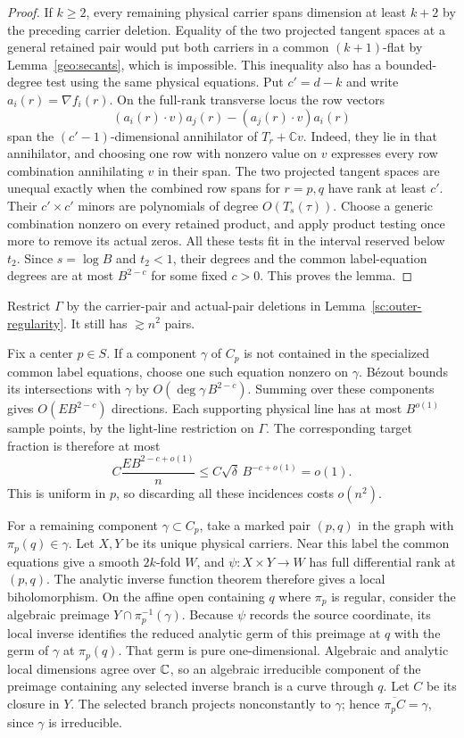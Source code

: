 \begin{proof}
If $k\ge2$, every remaining physical carrier spans dimension at least
$k+2$ by the preceding carrier deletion.  Equality of the two projected tangent
spaces at a general retained pair would put both carriers in a common
$(k+1)$-flat by Lemma~\ref{geo:secants}, which is impossible.  This
inequality also has a bounded-degree test using the same physical
equations.  Put $c'=d-k$ and write $a_i(r)=\nabla f_i(r)$.  On the
full-rank transverse locus the row vectors
\[
 (a_i(r)\mathbin{\cdot}v)a_j(r)
 -(a_j(r)\mathbin{\cdot}v)a_i(r)
\]
span the $(c'-1)$-dimensional annihilator of $T_r+\mathbb Cv$.
Indeed, they lie in that annihilator, and choosing one row with nonzero
value on $v$ expresses every row combination annihilating $v$ in their
span.  The two projected tangent spaces are unequal exactly when the
combined row spans for $r=p,q$ have rank at least $c'$.  Their
$c'\times c'$ minors are polynomials of degree $O(T_s(\tau))$.  Choose a generic
combination nonzero on every retained product, and apply product testing
once more to remove its actual zeros.  All these tests fit in
the interval reserved below $t_2$.  Since $s=\log B$ and $t_2<1$, their
degrees and the common label-equation degrees are at most $B^{2-c}$ for
some fixed $c>0$.  This proves the lemma.
\end{proof}

Restrict $\Gamma$ by the carrier-pair and actual-pair deletions in
Lemma~\ref{sc:outer-regularity}.  It still has $\gtrsim n^2$ pairs.

Fix a center $p\in S$.  If a component $\gamma$ of $C_p$ is not contained
in the specialized common label equations, choose one such equation
nonzero on $\gamma$.  B\'ezout bounds its intersections with $\gamma$ by
$O(\deg\gamma\,B^{2-c})$.  Summing over these components gives
$O(EB^{2-c})$ directions.  Each supporting physical line has at most
$B^{o(1)}$ sample points, by the light-line restriction on $\Gamma$.
The corresponding target fraction is therefore at most
\[
 C\frac{EB^{2-c+o(1)}}{n}
 \le C\sqrt\delta\,B^{-c+o(1)}=o(1).
\]
This is uniform in $p$, so discarding all these incidences costs $o(n^2)$.

For a remaining component $\gamma\subset C_p$, take a marked pair
$(p,q)$ in the graph with $\pi_p(q)\in\gamma$.  Let $X,Y$ be its unique
physical carriers.  Near this label the common equations give a smooth
$2k$-fold $W$, and $\psi:X\times Y\to W$ has full differential rank at
$(p,q)$.  The analytic inverse function theorem therefore gives a local
biholomorphism.  On the affine open containing $q$ where $\pi_p$ is
regular, consider the algebraic preimage $Y\cap\pi_p^{-1}(\gamma)$.
Because $\psi$ records the source coordinate, its local inverse identifies
the reduced analytic germ of this preimage at $q$ with the germ of
$\gamma$ at $\pi_p(q)$.  That germ is pure one-dimensional.  Algebraic and
analytic local dimensions agree over $\mathbb C$, so an algebraic irreducible
component of the preimage containing any selected inverse branch is a
curve through $q$.  Let $C$
be its closure in $Y$.  The selected branch projects nonconstantly to
$\gamma$; hence $\overline{\pi_pC}=\gamma$, since $\gamma$ is irreducible.

